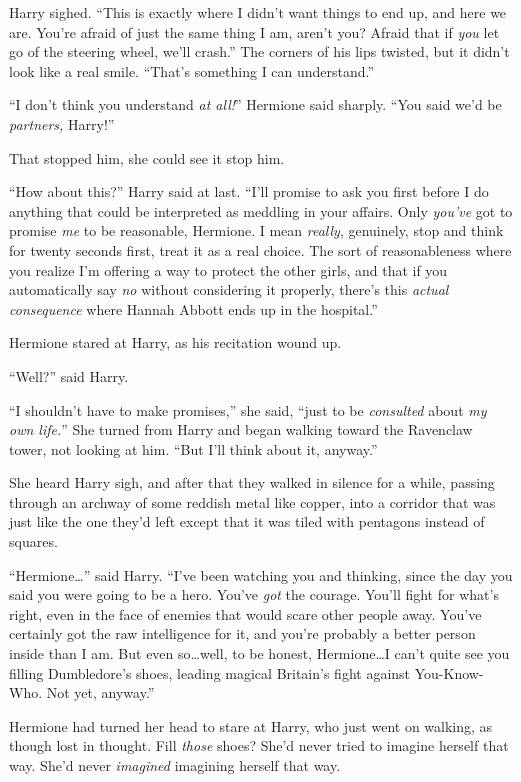Harry sighed. “This is exactly where I didn’t want things to end up, and here we are. You’re afraid of just the same thing I am, aren’t you? Afraid that if \emph{you} let go of the steering wheel, we’ll crash.” The corners of his lips twisted, but it didn’t look like a real smile. “That’s something I can understand.”

“I don’t think you understand \emph{at all!}” Hermione said sharply. “You said we’d be \emph{partners,} Harry!”

That stopped him, she could see it stop him.

“How about this?” Harry said at last. “I’ll promise to ask you first before I do anything that could be interpreted as meddling in your affairs. Only \emph{you’ve} got to promise \emph{me} to be reasonable, Hermione. I mean \emph{really}, genuinely, stop and think for twenty seconds first, treat it as a real choice. The sort of reasonableness where you realize I’m offering a way to protect the other girls, and that if you automatically say \emph{no} without considering it properly, there’s this \emph{actual consequence} where Hannah Abbott ends up in the hospital.”

Hermione stared at Harry, as his recitation wound up.

“Well?” said Harry.

“I shouldn’t have to make promises,” she said, “just to be \emph{consulted} about \emph{my own life.}” She turned from Harry and began walking toward the Ravenclaw tower, not looking at him. “But I’ll think about it, anyway.”

She heard Harry sigh, and after that they walked in silence for a while, passing through an archway of some reddish metal like copper, into a corridor that was just like the one they’d left except that it was tiled with pentagons instead of squares.

“Hermione…” said Harry. “I’ve been watching you and thinking, since the day you said you were going to be a hero. You’ve \emph{got} the courage. You’ll fight for what’s right, even in the face of enemies that would scare other people away. You’ve certainly got the raw intelligence for it, and you’re probably a better person inside than I am. But even so…well, to be honest, Hermione…I can’t quite see you filling Dumbledore’s shoes, leading magical Britain’s fight against You-Know-Who. Not yet, anyway.”

Hermione had turned her head to stare at Harry, who just went on walking, as though lost in thought. Fill \emph{those} shoes? She’d never tried to imagine herself that way. She’d never \emph{imagined} imagining herself that way.

